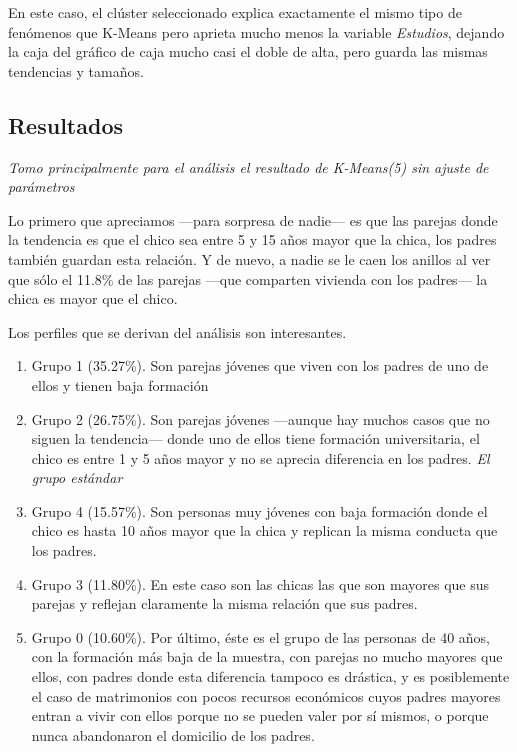 \documentclass{article}
\newcommand{\img}[2]{
\noindent\makebox[\textwidth][c]{\texttt{[image: img/\#1]}}%
}
\begin{document}
\img{edadDif_spectral_tuned_scatter}{0.8}

En este caso, el clúster seleccionado explica exactamente el mismo tipo de fenómenos que K-Means pero aprieta mucho menos la variable \textit{Estudios}, dejando la caja del gráfico de caja mucho casi el doble de alta, pero guarda las mismas tendencias y tamaños.

\subsection{Resultados}

\textit{Tomo principalmente para el análisis el resultado de K-Means(5) sin ajuste de parámetros}

Lo primero que apreciamos ---para sorpresa de nadie--- es que las parejas donde la tendencia es que el chico sea entre 5 y 15 años mayor que la chica, los padres también guardan esta relación. Y de nuevo, a nadie se le caen los anillos al ver que sólo el 11.8\% de las parejas ---que comparten vivienda con los padres--- la chica es mayor que el chico. 

Los perfiles que se derivan del análisis son interesantes.

\begin{enumerate}
\item Grupo 1 (35.27\%). Son parejas jóvenes que viven con los padres de uno de ellos y tienen baja formación
\item Grupo 2 (26.75\%). Son parejas jóvenes ---aunque hay muchos casos que no siguen la tendencia--- donde uno de ellos tiene formación universitaria, el chico es entre 1 y 5 años mayor y no se aprecia diferencia en los padres. \textit{El grupo estándar}
\item Grupo 4 (15.57\%). Son personas muy jóvenes con baja formación donde el chico es hasta 10 años mayor que la chica y replican la misma conducta que los padres.
\item Grupo 3 (11.80\%). En este caso son las chicas las que son mayores que sus parejas y reflejan claramente la misma relación que sus padres.
\item Grupo 0 (10.60\%). Por último, éste es el grupo de las personas de 40 años, con la formación más baja de la muestra, con parejas no mucho mayores que ellos, con padres donde esta diferencia tampoco es drástica, y es posiblemente el caso de matrimonios con pocos recursos económicos cuyos padres mayores entran a vivir con ellos porque no se pueden valer por sí mismos, o porque nunca abandonaron el domicilio de los padres.
\end{enumerate}
\end{document}
